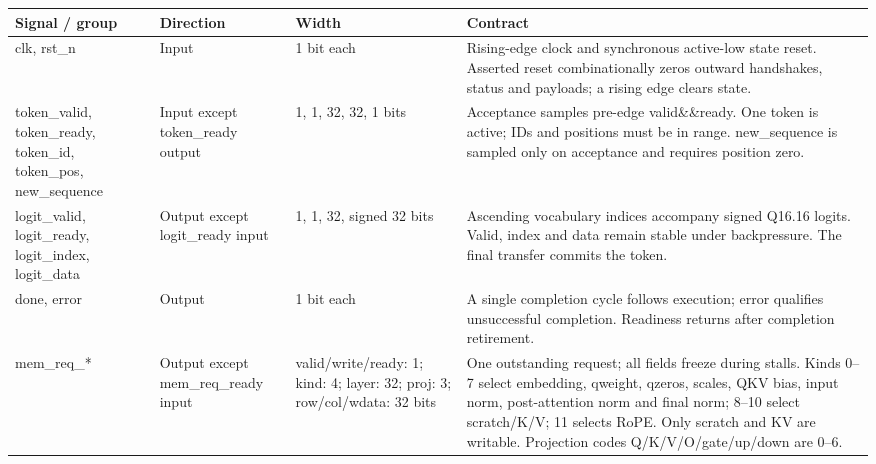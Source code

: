 \documentclass[11pt,a4paper]{article}
\begin{document}
{\small\renewcommand{\arraystretch}{1.18}\begin{longtable}{@{}L{0.21\textwidth}|L{0.12\textwidth}|L{0.12\textwidth}|L{0.45\textwidth}@{}}\toprule

\textbf{Signal /\allowbreak{} group} & \textbf{Direction} & \textbf{Width} & \textbf{Contract}\\\midrule\endhead

clk,\allowbreak{} rst\_\allowbreak{}n & Input & 1 bit each & Rising-edge clock and synchronous active-low state reset. Asserted reset combinationally zeros outward handshakes,\allowbreak{} status and payloads; a rising edge clears state.\\[2pt]\hline

token\_\allowbreak{}valid,\allowbreak{} token\_\allowbreak{}ready,\allowbreak{} token\_\allowbreak{}id,\allowbreak{} token\_\allowbreak{}pos,\allowbreak{} new\_\allowbreak{}sequence & Input except token\_\allowbreak{}ready output & 1,\allowbreak{} 1,\allowbreak{} 32,\allowbreak{} 32,\allowbreak{} 1 bits & Acceptance samples pre-edge valid\&\&ready. One token is active; IDs and positions must be in range. new\_\allowbreak{}sequence is sampled only on acceptance and requires position zero.\\[2pt]\hline

logit\_\allowbreak{}valid,\allowbreak{} logit\_\allowbreak{}ready,\allowbreak{} logit\_\allowbreak{}index,\allowbreak{} logit\_\allowbreak{}data & Output except logit\_\allowbreak{}ready input & 1,\allowbreak{} 1,\allowbreak{} 32,\allowbreak{} signed 32 bits & Ascending vocabulary indices accompany signed Q16.16 logits. Valid,\allowbreak{} index and data remain stable under backpressure. The final transfer commits the token.\\[2pt]\hline

done,\allowbreak{} error & Output & 1 bit each & A single completion cycle follows execution; error qualifies unsuccessful completion. Readiness returns after completion retirement.\\[2pt]\hline

mem\_\allowbreak{}req\_\allowbreak{}*\allowbreak{} & Output except mem\_\allowbreak{}req\_\allowbreak{}ready input & valid/\allowbreak{}write/\allowbreak{}ready: 1; kind: 4; layer: 32; proj: 3; row/\allowbreak{}col/\allowbreak{}wdata: 32 bits & One outstanding request; all fields freeze during stalls. Kinds 0–7 select embedding,\allowbreak{} qweight,\allowbreak{} qzeros,\allowbreak{} scales,\allowbreak{} QKV bias,\allowbreak{} input norm,\allowbreak{} post-attention norm and final norm; 8–10 select scratch/\allowbreak{}K/\allowbreak{}V; 11 selects RoPE. Only scratch and KV are writable. Projection codes Q/\allowbreak{}K/\allowbreak{}V/\allowbreak{}O/\allowbreak{}gate/\allowbreak{}up/\allowbreak{}down are 0–6.\\[2pt]\hline


\end{longtable}}
\end{document}
